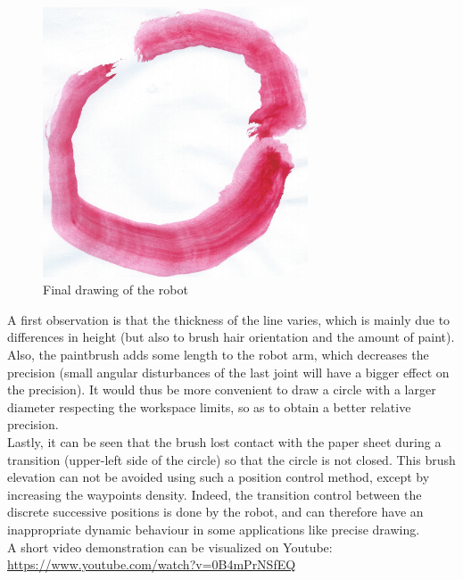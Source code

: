  \begin{figure}[!ht]
	\centering
    \includegraphics[width = 0.7\textwidth]{Images/masterpiece-cropped.jpg}
    \caption{Final drawing of the robot}
    \label{fig:draw}
\end{figure}

\noindent A first observation is that the thickness of the line varies, which is mainly due to differences in height (but also to brush hair orientation and the amount of paint).\\
\noindent Also, the paintbrush adds some length to the robot arm, which decreases the precision (small angular disturbances of the last joint will have a bigger effect on the precision). It would thus be more convenient to draw a circle with a larger diameter respecting the workspace limits, so as to obtain a better relative precision.\\
\noindent Lastly, it can be seen that the brush lost contact with the paper sheet during a transition (upper-left side of the circle) so that the circle is not closed. This brush elevation can not be avoided using such a position control method, except by increasing the waypoints density. Indeed, the transition control between the discrete successive positions is done by the robot, and can therefore have an inappropriate dynamic behaviour in some applications like precise drawing.\\

\noindent A short video demonstration can be visualized on Youtube: \\\url{https://www.youtube.com/watch?v=0B4mPrNSfEQ}